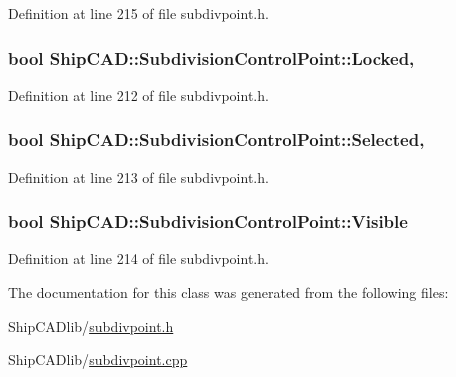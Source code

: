 Definition at line 215 of file subdivpoint.\-h.

\hypertarget{classShipCAD_1_1SubdivisionControlPoint_af7c63177a12f4c60bb4a2a6615482a98}{
\subsubsection[{Locked}]{\setlength{\rightskip}{0pt plus 5cm}bool Ship\-C\-A\-D\-::\-Subdivision\-Control\-Point\-::\-Locked\hspace{0.3cm}{\ttfamily [read]}, {\ttfamily [write]}}}\label{classShipCAD_1_1SubdivisionControlPoint_af7c63177a12f4c60bb4a2a6615482a98}


Definition at line 212 of file subdivpoint.\-h.

\hypertarget{classShipCAD_1_1SubdivisionControlPoint_a54bf97e33f121843af563f2eebe7d3e5}{
\subsubsection[{Selected}]{\setlength{\rightskip}{0pt plus 5cm}bool Ship\-C\-A\-D\-::\-Subdivision\-Control\-Point\-::\-Selected\hspace{0.3cm}{\ttfamily [read]}, {\ttfamily [write]}}}\label{classShipCAD_1_1SubdivisionControlPoint_a54bf97e33f121843af563f2eebe7d3e5}


Definition at line 213 of file subdivpoint.\-h.

\hypertarget{classShipCAD_1_1SubdivisionControlPoint_ab796dbf230e01f51a1031ec69f8f7f66}{
\subsubsection[{Visible}]{\setlength{\rightskip}{0pt plus 5cm}bool Ship\-C\-A\-D\-::\-Subdivision\-Control\-Point\-::\-Visible\hspace{0.3cm}{\ttfamily [read]}}}\label{classShipCAD_1_1SubdivisionControlPoint_ab796dbf230e01f51a1031ec69f8f7f66}


Definition at line 214 of file subdivpoint.\-h.



The documentation for this class was generated from the following files\-:\begin{DoxyCompactItemize}
\item 
Ship\-C\-A\-Dlib/\hyperlink{subdivpoint_8h}{subdivpoint.\-h}\item 
Ship\-C\-A\-Dlib/\hyperlink{subdivpoint_8cpp}{subdivpoint.\-cpp}\end{DoxyCompactItemize}
